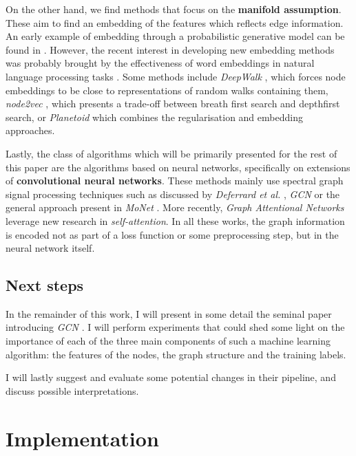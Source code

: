\documentclass[10pt,a4]{article}
\begin{document}
    On the other hand, we find methods that focus on the \textbf{manifold assumption}. 
    These aim to find an embedding of the features which reflects edge information. 
    An early example of embedding through a probabilistic generative model can be 
    found in \cite{nowicki2001estimation}. However, the recent interest in developing new
    embedding methods was probably brought by the effectiveness of word embeddings 
    in natural language processing tasks \cite{mikolov2013distributed}. Some methods include
    \emph{DeepWalk} \cite{perozzi2014deepwalk}, which forces node embeddings to be close to 
    representations of random walks containing them, \emph{node2vec} \cite{grover2016node2vec}, 
    which presents a trade-off between breath first search and depth\-first search, 
    or \emph{Planetoid} \cite{yang2016revisiting} which combines the regularisation 
    and embedding approaches.
    
    Lastly, the class of algorithms which will be primarily presented for the 
    rest of this paper are the algorithms based on neural networks, specifically 
    on extensions of \textbf{convolutional neural networks}. These methods mainly use 
    spectral graph signal processing techniques such as discussed by \emph{Deferrard et al.} 
    \cite{defferrard2016convolutional}, \emph{GCN} \cite{kipf2016semi} or the 
    general approach present in \emph{MoNet} \cite{monti2017geometric}. More recently, 
    \emph{Graph Attentional Networks} \cite{velivckovic2017graph} leverage new
    research in \emph{self-attention}. 
    In all these works, the graph information is encoded not as part of a loss 
    function or some preprocessing step, but in the neural network itself.  
    
    \subsection{Next steps}

    In the remainder of this work, I will present in some detail the seminal 
    paper introducing \emph{GCN} \cite{kipf2016semi}. I will perform experiments
    that could shed some light on the importance of each of the three main 
    components of such a machine learning algorithm: the features of the nodes,
    the graph structure and the training labels. 
    
    I will lastly suggest and evaluate some potential changes in their pipeline, 
    and discuss possible interpretations.
    
    \section{Implementation} \label{impl}
    
\end{document}

